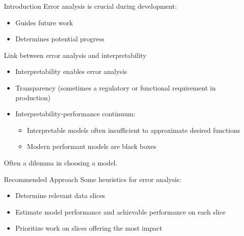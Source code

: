 
\begin{frame}{Introduction}
  Error analysis is crucial during development:

  \begin{itemize}
    \item Guides future work
    \item Determines potential progress
  \end{itemize}

  \hugo
\end{frame}


\begin{frame}{Link between error analysis and interpretability}
  \begin{itemize}
    \item Interpretability enables error analysis
    \item Transparency (sometimes a regulatory or functional requirement in production)
    \item Interpretability-performance continuum:
      \begin{itemize}
        \item Interpretable models often insufficient to approximate desired functions
        \item Modern performant models are black boxes
      \end{itemize}
  \end{itemize}

  Often a dilemma in choosing a model.


  \hugo
\end{frame}


\begin{frame}{Recommended Approach}
  Some heuristics for error analysis:

  \begin{itemize}
    \item Determine relevant data slices
    \item Estimate model performance and achievable performance on each slice
    \item Prioritize work on slices offering the most impact
  \end{itemize}

  \hugo
\end{frame}


